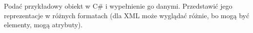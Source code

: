 Podać przykładowy obiekt w C\# i wypełnienie go danymi. Przedstawić jego reprezentacje w różnych formatach (dla XML może wyglądać różnie, bo mogą być elementy, mogą atrybuty).

%
%
%
%

